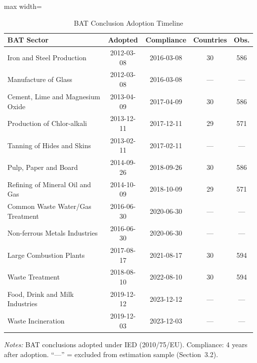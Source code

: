 \begin{table}[H]
\centering
\caption{BAT Conclusion Adoption Timeline}
\label{tab:bat_timeline}
\begin{adjustbox}{max width=\textwidth}
\begin{tabular}{lcccc}
\toprule
BAT Sector & Adopted & Compliance & Countries & Obs. \\
\midrule
Iron and Steel Production & 2012-03-08 & 2016-03-08 & 30 & 586 \\
Manufacture of Glass & 2012-03-08 & 2016-03-08 & --- & --- \\
Cement, Lime and Magnesium Oxide & 2013-04-09 & 2017-04-09 & 30 & 586 \\
Production of Chlor-alkali & 2013-12-11 & 2017-12-11 & 29 & 571 \\
Tanning of Hides and Skins & 2013-02-11 & 2017-02-11 & --- & --- \\
Pulp, Paper and Board & 2014-09-26 & 2018-09-26 & 30 & 586 \\
Refining of Mineral Oil and Gas & 2014-10-09 & 2018-10-09 & 29 & 571 \\
Common Waste Water/Gas Treatment & 2016-06-30 & 2020-06-30 & --- & --- \\
Non-ferrous Metals Industries & 2016-06-30 & 2020-06-30 & --- & --- \\
Large Combustion Plants & 2017-08-17 & 2021-08-17 & 30 & 594 \\
Waste Treatment & 2018-08-10 & 2022-08-10 & 30 & 594 \\
Food, Drink and Milk Industries & 2019-12-12 & 2023-12-12 & --- & --- \\
Waste Incineration & 2019-12-03 & 2023-12-03 & --- & --- \\
\bottomrule
\end{tabular}
\end{adjustbox}
\par\vspace{0.3em}
{\footnotesize \emph{Notes:} BAT conclusions adopted under IED (2010/75/EU). Compliance: 4 years after adoption. ``---'' = excluded from estimation sample (Section~3.2).}
\end{table}

